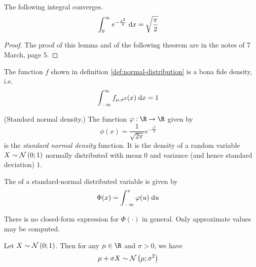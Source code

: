 \documentclass[11pt]{article}
\begin{document}
\begin{lem}
    \label{lem:normal-is-legit}
    The following integral converges.
    \begin{equation*}
        \int^{\infty}_0 { e^{-\frac{x^2}{2}} \;\mathrm{d} x }
        = \sqrt{\frac{\pi}{2}}
    \end{equation*}
\end{lem}

\begin{proof}
    The proof of this lemma and of the following theorem are in the notes of 7
    March, page 5.
\end{proof}

\begin{thm}
    \label{thm:normal-is-legit}
    The function $f$ shown in definition \ref{def:normal-distribution} is a
    bona fide density,
    i.e.
    \begin{equation}
        \label{eq:normal-is-legit}
        \int_{-\infty}^{\infty} f_{\mu,\sigma^2} (x) \;\mathrm{d} x = 1
    \end{equation}
\end{thm}

\begin{defn}{(Standard normal density.)}
    \label{def:standard-normal}
    The function $\phi : \R \to \R$ given by
    \begin{equation}
        \label{eq:standard-normal}
        \phi(x) = \frac{1}{\sqrt{2 \pi}} e^{-\frac{x^2}{2}}
    \end{equation}
    is the \emph{standard normal density} function.
    It is the density of a random variable $X \sim \operatorname{\mathcal{N}}\left(0;1\right)$ normally
    distributed with mean $0$ and variance (and hence standard deviation) $1$.
\end{defn}

\begin{rem}
    \label{rem:cdf-of-standard-normal}
    The \cdf{} of a standard-normal distributed variable is given by
    \begin{equation}
        \label{eq:cdf-of-standard-normal}
        \Phi(x) = \int_{-\infty}^x \varphi(u) \;\mathrm{d} u
    \end{equation}

    There is no closed-form expression for $\Phi(\cdot)$ in general.
    Only approximate values may be computed.
\end{rem}

\begin{thm}
    \label{thm:std-normal-to-normal}
    Let $X \sim \operatorname{\mathcal{N}}\left(0;1\right)$.
    Then for any $\mu \in \R$ and $\sigma > 0$, we have
    \begin{equation}
        \label{eq:std-normal-to-normal-1}
        \mu + \sigma X \sim \operatorname{\mathcal{N}}\left(\mu;\sigma^2\right)
    \end{equation}
\end{thm}
\end{document}
